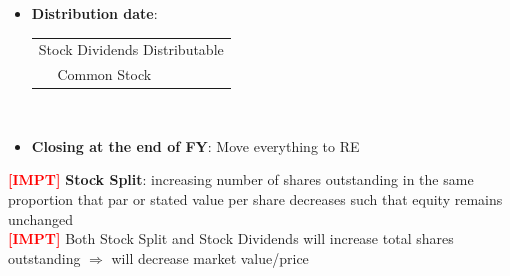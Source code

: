 \documentclass{article}
\newcommand{\impt}[0]{\textcolor{red}{\textbf{[IMPT] }}}
\begin{document}
\begin{multicols}{2}
\begin{itemize}
	\item \textbf{Distribution date}:\vspace{0.5em}\\
	\begin{tabular}{llll}
		\multicolumn{4}{l}{Stock Dividends Distributable}\\
		& Common Stock& &
	\end{tabular}\vspace{0.5em}\\
	\item \textbf{Closing at the end of FY}: Move everything to RE
\end{itemize}
\impt \textbf{Stock Split}: increasing number of shares outstanding in the same proportion that par or stated value per share decreases such that equity remains unchanged\\
\impt Both Stock Split and Stock Dividends will increase total shares outstanding $\Rightarrow$ will decrease market value/price


\end{multicols}
\end{document}
